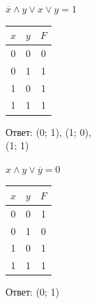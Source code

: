     \begin{minipage}[t]{0.3\textwidth}
        \centering
        \begin{enumerate}
            \setcounter{enumi}{2}
            \begin{spacing}{1.2}
                \item $\overline x \wedge y \vee x \vee y = 1$\\
            \end{spacing}
            \begin{tabular}{|c|c|c|}
                \hline
                $x$ & $y$ & $F$ \\
                \hline
                0   & 0   & 0   \\
                \hline
                0   & 1   & 1   \\
                \hline
                1   & 0   & 1   \\
                \hline
                1   & 1   & 1   \\
                \hline
            \end{tabular}
        \end{enumerate}
        Ответ: (0; 1), (1; 0), \\(1; 1)
    \end{minipage}

    \begin{center}\end{center}

    \begin{minipage}[t]{0.3\textwidth}
        \centering
        \begin{enumerate}
            \setcounter{enumi}{4}
            \begin{spacing}{1.2}
                \item $x \wedge y \vee \overline y = 0$\\
            \end{spacing}
            \begin{tabular}{|c|c|c|}
                \hline
                $x$ & $y$ & $F$ \\
                \hline
                0   & 0   & 1   \\
                \hline
                0   & 1   & 0   \\
                \hline
                1   & 0   & 1   \\
                \hline
                1   & 1   & 1   \\
                \hline
            \end{tabular}
        \end{enumerate}
        Ответ: (0; 1)
    \end{minipage}

